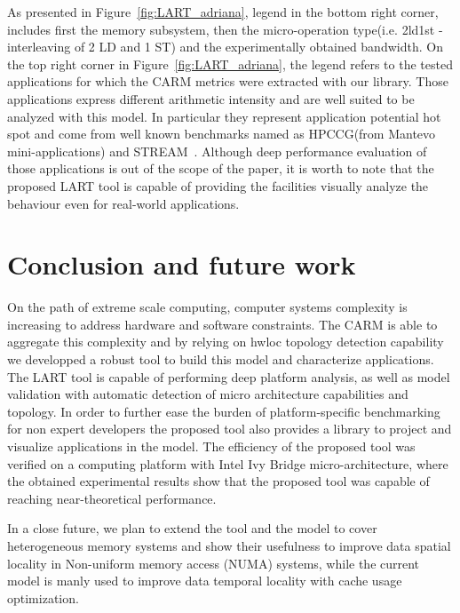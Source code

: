 \documentclass[twoside,twocolumn,9pt]{extarticle}
\begin{document}
As presented in Figure~\ref{fig:LART_adriana}, legend in the bottom right corner, includes first the memory subsystem,
then the micro-operation type(i.e. 2ld1st - interleaving of 2 LD and 1 ST) and the experimentally obtained bandwidth.
On the top right corner in Figure~\ref{fig:LART_adriana}, the legend refers to the tested applications for which the CARM metrics
were extracted with our library. Those applications express different arithmetic intensity and are well suited to be analyzed with
this model. In particular they represent application potential hot spot and come from well
known benchmarks named as HPCCG(from Mantevo~\cite{barrett2015assessing} mini-applications) and STREAM~\cite{mccalpin1995stream}.
Although deep performance evaluation of those applications is out of the scope of the
paper, it is worth to note that the proposed LART tool is capable of providing the facilities visually analyze the behaviour even
for real-world applications.

\section{Conclusion and future work}\label{sec:conclusion}

On the path of extreme scale computing, computer systems complexity is increasing to address hardware and software constraints.
The CARM is able to aggregate this complexity and by relying on hwloc topology detection capability we developped a robust tool to
build this model and characterize applications. The LART tool is capable of performing deep platform analysis,
as well as model validation with automatic detection of micro architecture capabilities and topology.
In order to further ease the burden of platform-specific benchmarking for non expert developers the proposed tool also provides a
library to project and visualize applications in the model.
The efficiency of the proposed tool was verified on a computing platform with Intel Ivy Bridge micro-architecture, where the
obtained experimental results show that the proposed tool was capable of reaching near-theoretical performance.

In a close future, we plan to extend the tool and the model to cover heterogeneous memory systems and show their usefulness to
improve data spatial locality in Non-uniform memory access (NUMA) systems, while the current model is manly used to improve data
temporal locality with cache usage optimization.



\end{document}
